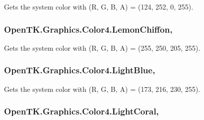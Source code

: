 Gets the system color with (R, G, B, A) = (124, 252, 0, 255). 

\hypertarget{struct_open_t_k_1_1_graphics_1_1_color4_ab7c02e7e9f45bdecb19a14715c92ae61}{
\subsubsection[{Lemon\-Chiffon}]{ Open\-T\-K.\-Graphics.\-Color4.\-Lemon\-Chiffon\hspace{0.3cm}{\ttfamily [static]}, {\ttfamily [get]}}}\label{struct_open_t_k_1_1_graphics_1_1_color4_ab7c02e7e9f45bdecb19a14715c92ae61}


Gets the system color with (R, G, B, A) = (255, 250, 205, 255). 

\hypertarget{struct_open_t_k_1_1_graphics_1_1_color4_abcb61e9015feb7abd0b61e054d037f07}{
\subsubsection[{Light\-Blue}]{ Open\-T\-K.\-Graphics.\-Color4.\-Light\-Blue\hspace{0.3cm}{\ttfamily [static]}, {\ttfamily [get]}}}\label{struct_open_t_k_1_1_graphics_1_1_color4_abcb61e9015feb7abd0b61e054d037f07}


Gets the system color with (R, G, B, A) = (173, 216, 230, 255). 

\hypertarget{struct_open_t_k_1_1_graphics_1_1_color4_a3cea5d4c348f9f95f4460590aff13f4f}{
\subsubsection[{Light\-Coral}]{ Open\-T\-K.\-Graphics.\-Color4.\-Light\-Coral\hspace{0.3cm}{\ttfamily [static]}, {\ttfamily [get]}}}\label{struct_open_t_k_1_1_graphics_1_1_color4_a3cea5d4c348f9f95f4460590aff13f4f}


